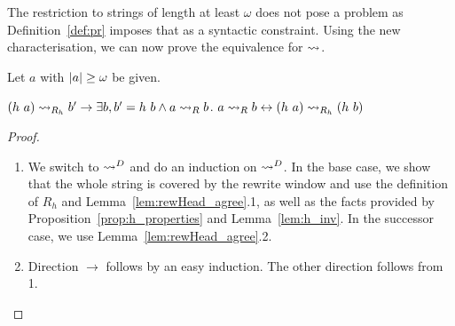The restriction to strings of length at least $\omega$ does not pose a problem as Definition~\ref{def:pr} imposes that as a syntactic constraint.
Using the new characterisation, we can now prove the equivalence for $\rightsquigarrow_{}$.
\begin{lemma}
  Let $a$ with $|a| \ge \omega$ be given.
  \begin{enumerate}
     $(h~a) \rightsquigarrow_{R_h} b' \rightarrow \exists b, b' = h~b \land a \rightsquigarrow_{R} b$. 
     $a \rightsquigarrow_{R} b \leftrightarrow (h~a) \rightsquigarrow_{R_h} (h~b)$
  \end{enumerate}
\end{lemma}
\begin{proof}
  \begin{enumerate}
    \item We switch to $\rightsquigarrow^D$ and do an induction on $\rightsquigarrow^D$. In the base case, we show that the whole string is covered by the rewrite window and use the definition of $R_h$ and Lemma~\ref{lem:rewHead_agree}.1, as well as the facts provided by Proposition~\ref{prop:h_properties} and Lemma~\ref{lem:h_inv}.
      In the successor case, we use Lemma~\ref{lem:rewHead_agree}.2.
    \item Direction $\rightarrow$ follows by an easy induction. The other direction follows from 1.
  \end{enumerate}
\end{proof}



